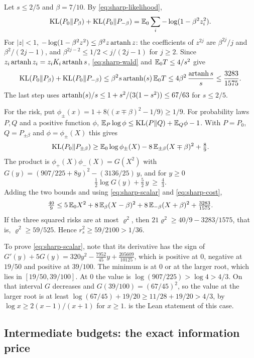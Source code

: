 Let $s\le2/5$ and $\beta=7/10$. By \eqref{eq:sharp-likelihood},
\[
 \operatorname{KL}(P_0\Vert P_\beta)+\operatorname{KL}(P_0\Vert P_{-\beta})
 =\mathbb E_0\sum_i-\log(1-\beta^2z_i^2).
\]
For $|z|<1$, $-\log(1-\beta^2z^2)\le\beta^2z\operatorname{artanh} z$: the coefficients
of $z^{2j}$ are $\beta^{2j}/j$ and $\beta^2/(2j-1)$, and
$\beta^{2j-2}\le1/2<j/(2j-1)$ for $j\ge2$. Since
$z_i\operatorname{artanh} z_i=z_iK_i\operatorname{artanh} s$, \eqref{eq:sharp-wald} and
$\mathbb E_0T\le4/s^2$ give
\begin{equation}\label{eq:sharp-cost}
 \operatorname{KL}(P_0\Vert P_\beta)+\operatorname{KL}(P_0\Vert P_{-\beta})
 \le\beta^2s\operatorname{artanh}(s)\,\mathbb E_0T
 \le4\beta^2\,\frac{\operatorname{artanh} s}{s}
 \le\frac{3283}{1575}.
\end{equation}
The last step uses
$\operatorname{artanh}(s)/s\le1+s^2/(3(1-s^2))\le67/63$ for $s\le2/5$.

For the risk, put
$\phi_\pm(x)=1+8\bigl((x\mp\beta)^2-1/9\bigr)\ge1/9$. For probability
laws $P,Q$ and a positive function $\phi$,
$\mathbb E_P\log\phi\le\operatorname{KL}(P\Vert Q)+\mathbb E_Q\phi-1$. With $P=P_0$,
$Q=P_{\pm\beta}$ and $\phi=\phi_\pm(X)$ this gives
\[
 \operatorname{KL}(P_0\Vert P_{\pm\beta})\ge\mathbb E_0\log\phi_\pm(X)
   -8\,\mathbb E_{\pm\beta}(X\mp\beta)^2+\tfrac89 .
\]
The product is $\phi_+(X)\phi_-(X)=G(X^2)$ with
$G(y)=(907/225+8y)^2-(3136/25)\,y$, and for $y\ge0$
\begin{equation}\label{eq:sharp-scalar}
 \tfrac12\log G(y)+\tfrac52\,y\ \ge\ \tfrac43 .
\end{equation}
Adding the two bounds and using \eqref{eq:sharp-scalar} and
\eqref{eq:sharp-cost},
\[
 \tfrac{40}9\le5\,\mathbb E_0X^2+8\,\mathbb E_\beta(X-\beta)^2+8\,\mathbb E_{-\beta}(X+\beta)^2
 +\tfrac{3283}{1575}.
\]
If the three squared risks are at most $\varrho^2$, then
$21\varrho^2\ge40/9-3283/1575$, that is, $\varrho^2\ge59/525$. Hence
$r_s^2\ge59/2100>1/36$.

To prove \eqref{eq:sharp-scalar}, note that its derivative has the sign of
$G'(y)+5G(y)=320y^2-\tfrac{7952}{45}y+\tfrac{205609}{10125}$, which is
positive at $0$, negative at $19/50$ and positive at $39/100$. The minimum
is at $0$ or at the larger root, which lies in $[19/50,39/100]$. At $0$
the value is $\log(907/225)>\log4>4/3$. On that interval $G$ decreases
and $G(39/100)=(67/45)^2$, so the value at the larger root is at least
$\log(67/45)+19/20\ge11/28+19/20>4/3$, by $\log x\ge2(x-1)/(x+1)$ for $x\ge1$.
 is the
Lean statement of this case.

\subsection{Intermediate budgets: the exact information price}
\label{sec:sharp-middle}

